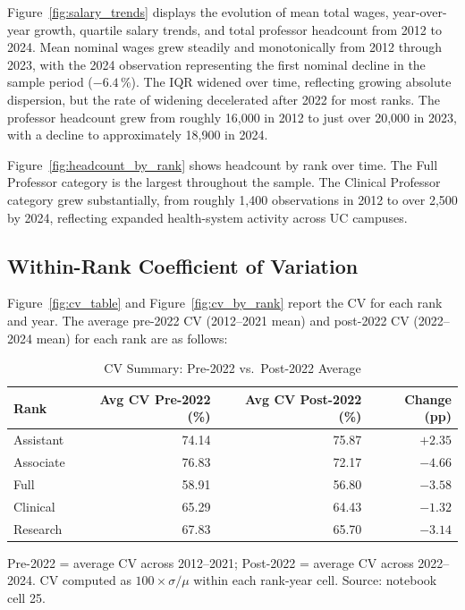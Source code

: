\documentclass[12pt]{article}
\begin{document}
Figure~\ref{fig:salary_trends} displays the evolution of mean total
wages, year-over-year growth, quartile salary trends, and total professor
headcount from 2012 to 2024. Mean nominal wages grew steadily and
monotonically from 2012 through 2023, with the 2024 observation
representing the first nominal decline in the sample period ($-6.4$\,\%).
The IQR widened over time, reflecting growing absolute dispersion, but
the rate of widening decelerated after 2022 for most ranks. The
professor headcount grew from roughly 16,000 in 2012 to just over 20,000
in 2023, with a decline to approximately 18,900 in 2024.

Figure~\ref{fig:headcount_by_rank} shows headcount by rank over time.
The Full Professor category is the largest throughout the sample. The
Clinical Professor category grew substantially, from roughly 1,400
observations in 2012 to over 2,500 by 2024, reflecting expanded
health-system activity across UC campuses.

\subsection{Within-Rank Coefficient of Variation}
\label{subsec:cv}

Figure~\ref{fig:cv_table} and Figure~\ref{fig:cv_by_rank} report the CV for
each rank and year. The average pre-2022 CV (2012--2021 mean) and
post-2022 CV (2022--2024 mean) for each rank are as follows:

\begin{table}[H]
\centering
\caption{CV Summary: Pre-2022 vs.\ Post-2022 Average}
\label{tab:cv_summary}
\begin{tabular}{lrrr}
\toprule
Rank & Avg CV Pre-2022 (\%) & Avg CV Post-2022 (\%) & Change (pp) \\
\midrule
Assistant  & 74.14 & 75.87 & $+2.35$ \\
Associate  & 76.83 & 72.17 & $-4.66$ \\
Full       & 58.91 & 56.80 & $-3.58$ \\
Clinical   & 65.29 & 64.43 & $-1.32$ \\
Research   & 67.83 & 65.70 & $-3.14$ \\
\bottomrule
\end{tabular}
\begin{flushleft}
\small Pre-2022 = average CV across 2012--2021; Post-2022 = average CV
across 2022--2024. CV computed as $100 \times \sigma / \mu$ within each
rank-year cell. Source: notebook cell 25.
\end{flushleft}
\end{table}
\end{document}

